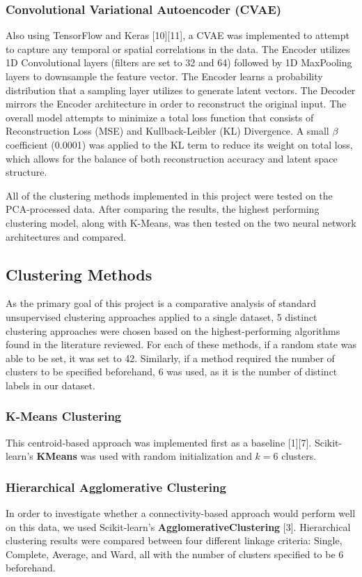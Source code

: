 \documentclass[12pt]{IEEEtran}
\begin{document}
\subsubsection{Convolutional Variational Autoencoder (CVAE)} Also using TensorFlow and Keras [10][11], a CVAE was implemented to attempt to capture any temporal or spatial correlations in the data. The Encoder utilizes 1D Convolutional layers (filters are set to 32 and 64) followed by 1D MaxPooling layers to downsample the feature vector. The Encoder learns a probability distribution that a sampling layer utilizes to generate latent vectors. The Decoder mirrors the Encoder architecture in order to reconstruct the original input. The overall model attempts to minimize a total loss function that consists of Reconstruction Loss (MSE) and Kullback-Leibler (KL) Divergence. A small $\beta$ coefficient (0.0001) was applied to the KL term to reduce its weight on total loss, which allows for the balance of both reconstruction accuracy and latent space structure.

All of the clustering methods implemented in this project were tested on the PCA-processed data. After comparing the results, the highest performing clustering model, along with K-Means, was then tested on the two neural network architectures and compared.

\subsection{Clustering Methods}
As the primary goal of this project is a comparative analysis of standard unsupervised clustering approaches applied to a single dataset, 5 distinct clustering approaches were chosen based on the highest-performing algorithms found in the literature reviewed. For each of these methods, if a random state was able to be set, it was set to 42. Similarly, if a method required the number of clusters to be specified beforehand, 6 was used, as it is the number of distinct labels in our dataset.

\subsubsection{K-Means Clustering} This centroid-based approach was implemented first as a baseline [1][7]. Scikit-learn's \textbf{KMeans} was used with random initialization and $k=6$ clusters.

\subsubsection{Hierarchical Agglomerative Clustering} In order to investigate whether a connectivity-based approach would perform well on this data, we used Scikit-learn's \textbf{AgglomerativeClustering} [3]. Hierarchical clustering results were compared between four different linkage criteria: Single, Complete, Average, and Ward, all with the number of clusters specified to be 6 beforehand. 
\end{document}
